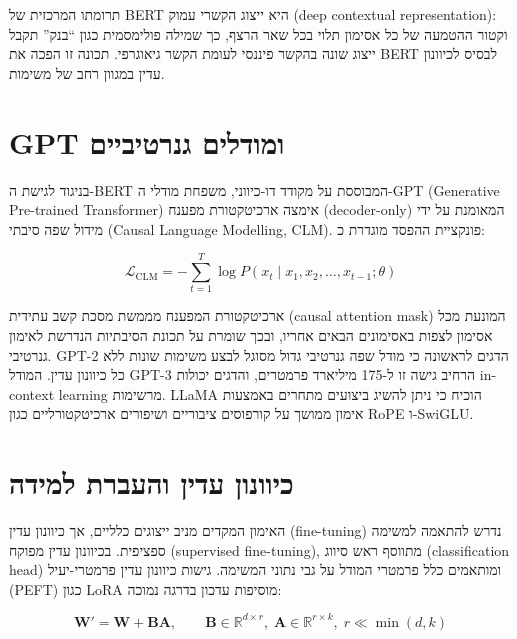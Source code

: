 תרומתו המרכזית של \textenglish{BERT} היא ייצוג הקשרי עמוק (\textenglish{deep contextual representation}): וקטור ההטמעה של כל אסימון תלוי בכל שאר הרצף, כך שמילה פולימסמית כגון ``בנק'' תקבל ייצוג שונה בהקשר פיננסי לעומת הקשר גיאוגרפי. תכונה זו הפכה את \textenglish{BERT} לבסיס לכיוונון עדין במגוון רחב של משימות.

\section{\textenglish{GPT} ומודלים גנרטיביים}

בניגוד לגישת ה-\textenglish{BERT} המבוססת על מקודד דו-כיווני, משפחת מודלי ה-\textenglish{GPT} (\textenglish{Generative Pre-trained Transformer}) \cite{radford2019language} אימצה ארכיטקטורת מפענח (\textenglish{decoder-only}) המאומנת על ידי מידול שפה סיבתי (\textenglish{Causal Language Modelling}, \textenglish{CLM}). פונקציית ההפסד מוגדרת כ:

\begin{equation}
\mathcal{L}_{\text{CLM}} = -\sum_{t=1}^{T} \log P\!\left(x_t \mid x_1, x_2, \ldots, x_{t-1}; \theta\right)
\end{equation}

ארכיטקטורת המפענח מממשת מסכת קשב עתידית (\textenglish{causal attention mask}) המונעת מכל אסימון לצפות באסימונים הבאים אחריו, ובכך שומרת על תכונת הסיבתיות הנדרשת לאימון גנרטיבי. \textenglish{GPT-2} \cite{radford2019language} הדגים לראשונה כי מודל שפה גנרטיבי גדול מסוגל לבצע משימות שונות ללא כל כיוונון עדין. המודל \textenglish{GPT-3} \cite{brown2020language} הרחיב גישה זו ל-175 מיליארד פרמטרים, והדגים יכולות \textenglish{in-context learning} מרשימות. \textenglish{LLaMA} \cite{touvron2023llama} הוכיח כי ניתן להשיג ביצועים מתחרים באמצעות אימון ממושך על קורפוסים ציבוריים ושיפורים ארכיטקטורליים כגון \textenglish{RoPE} ו-\textenglish{SwiGLU}.

\section{כיוונון עדין והעברת למידה}

האימון המקדים מניב ייצוגים כלליים, אך כיוונון עדין (\textenglish{fine-tuning}) נדרש להתאמה למשימה ספציפית. בכיוונון עדין מפוקח (\textenglish{supervised fine-tuning}), מתווסף ראש סיווג (\textenglish{classification head}) ומותאמים כלל פרמטרי המודל על גבי נתוני המשימה. גישות כיוונון עדין פרמטרי-יעיל (\textenglish{PEFT}) כגון \textenglish{LoRA} מוסיפות עדכון בדרגה נמוכה:

\begin{equation}
\mathbf{W}' = \mathbf{W} + \mathbf{B}\mathbf{A}, \qquad \mathbf{B} \in \mathbb{R}^{d \times r},\; \mathbf{A} \in \mathbb{R}^{r \times k},\; r \ll \min(d,k)
\end{equation}

